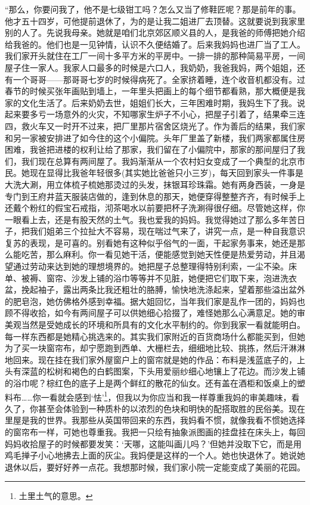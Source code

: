 \par “那么，你要问我了，他不是七级钳工吗？怎么又当了修鞋匠呢？那是前年的事。他才五十四岁，可他提前退休了，为的是让我二姐进厂去顶替。这就要说到我家里别的人了。先说我母亲。她就是咱们北京郊区顺义县的人，是我爸的师傅把她介绍给我爸的。他们也是一见钟情，认识不久便结婚了。后来我妈妈也进厂当了工人。我们家开头就住在工厂一间十多平方米的平房中。一排一排的那种简易平房，一间屋子住一家人。我家人口最多的时候是六口人，我奶奶，我爸我妈，两个姐姐，还有一个哥哥——那哥哥七岁的时候得病死了。全家挤着睡，连个收音机都没有。过春节的时候买张年画贴到墙上，一年里头把画上的每个细节都看熟，那大概便是我家的文化生活了。后来奶奶去世，姐姐们长大，三年困难时期，我妈生下了我。说起来要多亏一场意外的火灾，不知哪家生炉子不小心，把屋子引着了，结果牵三连四，救火车又一时开不过来，把厂里那片宿舍区烧光了。作为善后的结果，我们家和另一家被安排进了如今住的这个小偏院。头年厂里盖了新楼，我们两家都属住房困难，我爸把进楼的权利让给了那家，我们留在了小偏院中，那家的那间屋归了我们，我们现在总算有两间屋了。我妈渐渐从一个农村妇女变成了一个典型的北京市民。她现在显得比我爸年轻很多(其实她比爸爸只小三岁)，每天回到家头一件事是大洗大涮，用立体梳子梳她那烫过的头发，抹银耳珍珠霜。她有两身西装，一身是专门到王府井蓝天服装店做的，逢到休息的那天，她便穿得整整齐齐，有时候手上还戴个粉红的假宝石戒指，沏茶喝水以前要把杯子洗涮得很仔细。尽管她这样，你一眼看上去，还是有股天然的土气。我也爱我的妈妈。我觉得她过了那么多年苦日子，把我们姐弟三个拉扯大不容易，现在喘过气来了，讲究一点，是一种自我意识复苏的表现，是可喜的。别看她有这种似乎俗气的一面，干起家务事来，她还是那么能吃苦，那么麻利。你一看见她干活，便能感觉到她天性便是热爱劳动，并且渴望通过劳动来达到她的理想境界的。她把屋子总整理得特别利索，一尘不染。床单、被褥、窗帘、沙发上铺的浴巾等等并不见脏，她便把它们取下来，泡进洗衣盆，挽起袖子，露出两条比我还粗壮的胳膊，愉快地洗涤起来，望着那些溢出盆外的肥皂泡，她仿佛格外感到幸福。据大姐回忆，当年我们家是乱作一团的，妈妈也顾不得收拾，如今有两间屋子可以供她细心拾掇了，难怪她那么心满意足。她的审美观当然是受她成长的环境和所具有的文化水平制约的。你到我家一看就能明白。每一样东西都是她精心挑选来的。其实我们家附近的百货商场什么都能买到，但她为了买一块窗帘布，却宁愿跑到西单、大栅栏去，细细地比较、挑拣，然后汗淋淋地回来。现在挂在我们家外屋窗户上的窗帘就是她的作品：布料是浅蓝底子的，上头有深蓝的松树和褐色的白鹤图案，下头用爱丽纱细心地镶上了花边。而沙发上铺的浴巾呢？棕红色的底子上是两个鲜红的散花的仙女。还有盖在酒柜和饭桌上的塑料布……你一看就会感到‘怯’\footnote{土里土气的意思。}，但我以为你应当和我一样尊重我妈的审美趣味，看久了，你甚至会体验到一种质朴的以浓烈的色块和明快的配搭取胜的民俗美。现在里屋是我的世界。我那些从英国带回来的东西，我妈看不惯，就像我看不惯她选择的窗帘布一样，可她也尊重我。我把一只绘有抽象派图画的挂盘挂在床头上，每回妈妈收拾屋子的时候都要发笑：‘天哪，这能叫画儿吗？’但她并没取下它，而是用鸡毛掸子小心地拂去上面的灰尘。我妈便是这样的一个人。她也快退休了。她说她退休以后，要好好养一点花。我想那时候，我们家小院一定能变成了美丽的花园。
